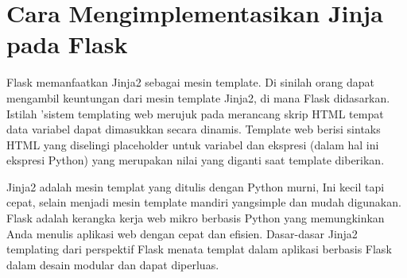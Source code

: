 \section{Cara Mengimplementasikan Jinja pada Flask}
Flask memanfaatkan Jinja2 sebagai mesin template. Di sinilah orang dapat mengambil keuntungan dari mesin template Jinja2, di mana Flask didasarkan. Istilah 'sistem templating web merujuk pada merancang skrip HTML tempat data variabel dapat dimasukkan secara dinamis. Template web berisi sintaks HTML yang diselingi placeholder untuk variabel dan ekspresi (dalam hal ini ekspresi Python) yang merupakan nilai yang diganti saat template diberikan.

Jinja2 adalah mesin templat yang ditulis dengan Python murni, Ini kecil tapi cepat, selain menjadi mesin template mandiri yangsimple dan mudah digunakan. Flask adalah kerangka kerja web mikro berbasis Python yang memungkinkan Anda menulis aplikasi web dengan cepat dan efisien. Dasar-dasar Jinja2 templating dari perspektif Flask menata templat dalam aplikasi berbasis Flask dalam desain modular dan dapat diperluas.
